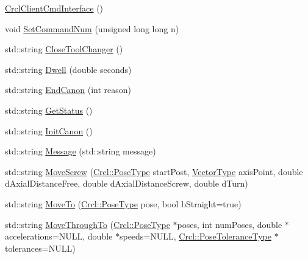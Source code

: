 \begin{DoxyCompactItemize}
\item 
\hyperlink{classCrcl_1_1CrclClientCmdInterface_a7c2ea74f24d04a0048b285ba98611749}{Crcl\-Client\-Cmd\-Interface} ()
\item 
void \hyperlink{classCrcl_1_1CrclClientCmdInterface_a089de9ab1afb6f23dbebcf844abd30e2}{Set\-Command\-Num} (unsigned long long n)
\item 
std\-::string \hyperlink{classCrcl_1_1CrclClientCmdInterface_a7373f6122f7c8386752a2cfde7f750e5}{Close\-Tool\-Changer} ()
\item 
std\-::string \hyperlink{classCrcl_1_1CrclClientCmdInterface_a1d58b154f382c7346d6dabba9c77a08e}{Dwell} (double seconds)
\item 
std\-::string \hyperlink{classCrcl_1_1CrclClientCmdInterface_a6222121cebc0938bd19863230ec7e3db}{End\-Canon} (int reason)
\item 
std\-::string \hyperlink{classCrcl_1_1CrclClientCmdInterface_a78a380822383ba3e848aa817d2e683ad}{Get\-Status} ()
\item 
std\-::string \hyperlink{classCrcl_1_1CrclClientCmdInterface_a52f5e4dbb9e788cf440913f59ceb39a1}{Init\-Canon} ()
\item 
std\-::string \hyperlink{classCrcl_1_1CrclClientCmdInterface_a3779c2ae65b84008cf18d7295bddd6bc}{Message} (std\-::string message)
\item 
std\-::string \hyperlink{classCrcl_1_1CrclClientCmdInterface_abf53a322d43d941e678886d38866d351}{Move\-Screw} (\hyperlink{namespaceCrcl_acc6c82b52280f4d0e74b82a92400956e}{Crcl\-::\-Pose\-Type} start\-Post, \hyperlink{namespaceCrcl_ae868d4ece511d1485ed5d9118395aef8}{Vector\-Type} axis\-Point, double d\-Axial\-Distance\-Free, double d\-Axial\-Distance\-Screw, double d\-Turn)
\item 
std\-::string \hyperlink{classCrcl_1_1CrclClientCmdInterface_acf53a82b11af8bbaee332e3838e5e041}{Move\-To} (\hyperlink{namespaceCrcl_acc6c82b52280f4d0e74b82a92400956e}{Crcl\-::\-Pose\-Type} pose, bool b\-Straight=true)
\item 
std\-::string \hyperlink{classCrcl_1_1CrclClientCmdInterface_a619a4f09c1d8e339db0f693c61298fa9}{Move\-Through\-To} (\hyperlink{namespaceCrcl_acc6c82b52280f4d0e74b82a92400956e}{Crcl\-::\-Pose\-Type} $\ast$poses, int num\-Poses, double $\ast$accelerations=N\-U\-L\-L, double $\ast$speeds=N\-U\-L\-L, \hyperlink{namespaceCrcl_ac805071e16341b82d4fa4e12b7f3ac6f}{Crcl\-::\-Pose\-Tolerance\-Type} $\ast$tolerances=N\-U\-L\-L)
\item 

\end{DoxyCompactItemize}
